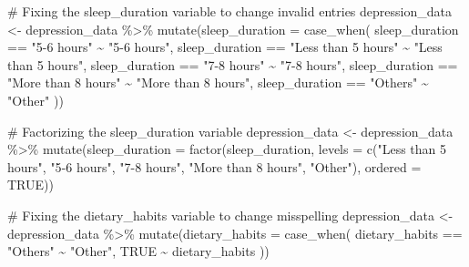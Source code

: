 \documentclass[
  letterpaper,
  DIV=11,
  numbers=noendperiod]{scrartcl}
\newenvironment{Shaded}{\begin{snugshade}}{\end{snugshade}}
\newcommand{\AttributeTok}[1]{\textcolor[rgb]{0.40,0.45,0.13}{#1}}
\newcommand{\CommentTok}[1]{\textcolor[rgb]{0.37,0.37,0.37}{#1}}
\newcommand{\ConstantTok}[1]{\textcolor[rgb]{0.56,0.35,0.01}{#1}}
\newcommand{\FunctionTok}[1]{\textcolor[rgb]{0.28,0.35,0.67}{#1}}
\newcommand{\NormalTok}[1]{\textcolor[rgb]{0.00,0.23,0.31}{#1}}
\newcommand{\OtherTok}[1]{\textcolor[rgb]{0.00,0.23,0.31}{#1}}
\newcommand{\SpecialCharTok}[1]{\textcolor[rgb]{0.37,0.37,0.37}{#1}}
\newcommand{\StringTok}[1]{\textcolor[rgb]{0.13,0.47,0.30}{#1}}
\begin{document}
\begin{Shaded}
\begin{Highlighting}[numbers=left,,]
\CommentTok{\# Fixing the \textasciigrave{}sleep\_duration\textasciigrave{} variable to change invalid entries}
\NormalTok{depression\_data }\OtherTok{\textless{}{-}}\NormalTok{ depression\_data }\SpecialCharTok{\%\textgreater{}\%} 
  \FunctionTok{mutate}\NormalTok{(}\AttributeTok{sleep\_duration =} \FunctionTok{case\_when}\NormalTok{(}
\NormalTok{    sleep\_duration }\SpecialCharTok{==} \StringTok{"\textquotesingle{}5{-}6 hours\textquotesingle{}"} \SpecialCharTok{\textasciitilde{}} \StringTok{"5{-}6 hours"}\NormalTok{,}
\NormalTok{    sleep\_duration }\SpecialCharTok{==} \StringTok{"\textquotesingle{}Less than 5 hours\textquotesingle{}"} \SpecialCharTok{\textasciitilde{}} \StringTok{"Less than 5 hours"}\NormalTok{,}
\NormalTok{    sleep\_duration }\SpecialCharTok{==} \StringTok{"\textquotesingle{}7{-}8 hours\textquotesingle{}"} \SpecialCharTok{\textasciitilde{}} \StringTok{"7{-}8 hours"}\NormalTok{,}
\NormalTok{    sleep\_duration }\SpecialCharTok{==} \StringTok{"\textquotesingle{}More than 8 hours\textquotesingle{}"} \SpecialCharTok{\textasciitilde{}} \StringTok{"More than 8 hours"}\NormalTok{,}
\NormalTok{    sleep\_duration }\SpecialCharTok{==} \StringTok{"Others"} \SpecialCharTok{\textasciitilde{}} \StringTok{"Other"}
\NormalTok{  ))}

\CommentTok{\# Factorizing the \textasciigrave{}sleep\_duration\textasciigrave{} variable}
\NormalTok{depression\_data }\OtherTok{\textless{}{-}}\NormalTok{ depression\_data }\SpecialCharTok{\%\textgreater{}\%}
  \FunctionTok{mutate}\NormalTok{(}\AttributeTok{sleep\_duration =} \FunctionTok{factor}\NormalTok{(sleep\_duration, }
                                 \AttributeTok{levels =} \FunctionTok{c}\NormalTok{(}\StringTok{"Less than 5 hours"}\NormalTok{, }
                                            \StringTok{"5{-}6 hours"}\NormalTok{, }
                                            \StringTok{"7{-}8 hours"}\NormalTok{, }
                                            \StringTok{"More than 8 hours"}\NormalTok{, }
                                            \StringTok{"Other"}\NormalTok{),}
                                 \AttributeTok{ordered =} \ConstantTok{TRUE}\NormalTok{))}

\CommentTok{\# Fixing the \textasciigrave{}dietary\_habits\textasciigrave{} variable to change misspelling}
\NormalTok{depression\_data }\OtherTok{\textless{}{-}}\NormalTok{ depression\_data }\SpecialCharTok{\%\textgreater{}\%} 
  \FunctionTok{mutate}\NormalTok{(}\AttributeTok{dietary\_habits =} \FunctionTok{case\_when}\NormalTok{(}
\NormalTok{    dietary\_habits }\SpecialCharTok{==} \StringTok{"Others"} \SpecialCharTok{\textasciitilde{}} \StringTok{"Other"}\NormalTok{,}
    \ConstantTok{TRUE} \SpecialCharTok{\textasciitilde{}}\NormalTok{ dietary\_habits}
\NormalTok{  ))}


\end{Highlighting}
\end{Shaded}
\end{document}
